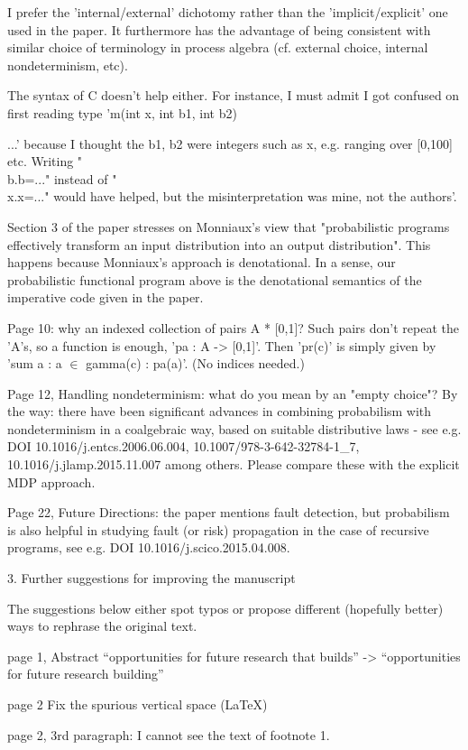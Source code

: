 \documentclass[12pm]{article}
\begin{document}
I prefer the 'internal/external' dichotomy rather than the 'implicit/explicit'
one used in the paper. It furthermore has the advantage of being
consistent with similar choice of terminology in process algebra
(cf. external choice, internal nondeterminism, etc).

The syntax of C doesn't help either. For instance, I must admit I got confused
on first reading type 'm(int x, int b1, int b2) {...' because I thought
the b1, b2 were integers such as x, e.g. ranging over [0,100] etc. Writing
"\\b.b=..." instead of "\\x.x=..." would have helped, but the misinterpretation
was mine, not the authors'.

Section 3 of the paper stresses on Monniaux’s view that "probabilistic
programs effectively transform an input distribution into an output
distribution". This happens because Monniaux’s approach is denotational.
In a sense, our probabilistic functional program above is the denotational
semantics of the imperative code given in the paper.

Page 10: why an indexed collection of pairs A * [0,1]? Such pairs
don't repeat the 'A's, so a function is enough, 'pa : A -> [0,1]'.
Then 'pr(c)' is simply given by 'sum a : a $\in$ gamma(c) : pa(a)'.
(No indices needed.)

Page 12, Handling nondeterminism: what do you mean by an "empty
choice"? By the way: there have been significant advances in combining
probabilism with nondeterminism in a coalgebraic way, based on
suitable distributive laws - see e.g. DOI 10.1016/j.entcs.2006.06.004,
10.1007/978-3-642-32784-1\_7, 10.1016/j.jlamp.2015.11.007 among
others. Please compare these with the explicit MDP approach.

Page 22, Future Directions: the paper mentions fault detection,
but probabilism is also helpful in studying fault (or risk)
propagation in the case of recursive programs, see e.g. 
DOI 10.1016/j.scico.2015.04.008.


3. Further suggestions for improving the manuscript

The suggestions below either spot typos or propose different
(hopefully better) ways to rephrase the original text.

page 1, Abstract “opportunities for future research that builds”
-> “opportunities for future research building”

page 2 Fix the spurious vertical space (LaTeX)

page 2, 3rd paragraph: I cannot see the text of footnote 1.

}
\end{document}
